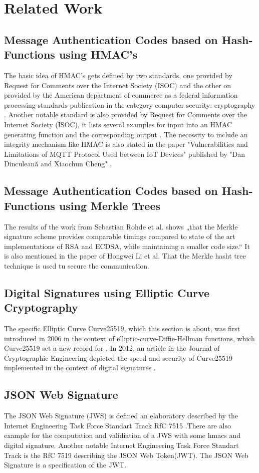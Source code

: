 \section{Related Work}

\subsection{Message Authentication Codes based on Hash-Functions using HMAC's}

The basic idea of HMAC’s gets defined by two standards, one provided by Request for Comments over the Internet Society (ISOC) \cite{RFC} and the other on provided by the American department of commerce as a federal information processing standards publication in the category computer security: cryptography \cite{FIBS}. Another notable standard is also provided by Request for Comments over the Internet Society (ISOC), it lists several examples for input into an HMAC generating function and the corresponding output \cite{RFC2}. The necessity to include an integrity mechanism like HMAC is also stated in the paper "Vulnerabilities and Limitations of MQTT Protocol
Used between IoT Devices" published by "Dan Dinculeană and Xiaochun Cheng" \cite{LIMI}.

\subsection{Message Authentication Codes based on Hash-Functions using Merkle Trees}
The results of the work from Sebastian Rohde et al. shows „that the Merkle signature scheme provides comparable timings compared to state of the art implementations of RSA and ECDSA, while maintaining a smaller code size.“ \cite{FHB} It is also mentioned in the paper of Hongwei Li et al. That the Merkle hasht tree technique is used tu secure the communication. \cite{METR}

\subsection{Digital Signatures using Elliptic Curve Cryptography}
The specific Elliptic Curve Curve25519, which this section is about, was first introduced in 2006 in the context of elliptic-curve-Diffie-Hellman functions, which Curve25519 set a new record for \cite{ECDH}. In 2012, an article in the Journal of Cryptographic Engineering depicted the speed and security of Curve25519 implemented in the context of digital signatures \cite{Curve25519}.

\subsection{JSON Web Signature}
The JSON Web Signature (JWS) is defined an elaboratory described by the Internet Engineering Task Force Standart Track RfC 7515 \cite{rfc7515}.There are also example for the computation and validiation of a JWS with some hmacs and digital signature. Another notable Internet Engineering Task Force Standart Track is the RfC 7519 \cite{rfc7519}describing the JSON Web Token(JWT). The JSON Web Signature is a specification of the JWT.
